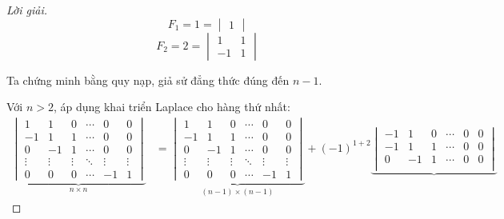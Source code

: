 \begin{proof}[Lời giải]
    \[
        F_{1} = 1 = \begin{vmatrix}1\end{vmatrix}
    \]
    \[
        F_{2} = 2 = \begin{vmatrix}1 & 1 \\ -1 & 1 \end{vmatrix}
    \]
    
    Ta chứng minh bằng quy nạp, giả sử đẳng thức đúng đến $n-1$.
    
    Với $n > 2$, áp dụng khai triển Laplace cho hàng thứ nhất:
    \begingroup{}
    \allowdisplaybreaks{}
    \begin{align*}
        \underbrace{\begin{vmatrix}
                            1      & 1      & 0      & \cdots & 0      & 0      \\
                            -1     & 1      & 1      & \cdots & 0      & 0      \\
                            0      & -1     & 1      & \cdots & 0      & 0      \\
                            \vdots & \vdots & \vdots & \ddots & \vdots & \vdots \\
                            0      & 0      & 0      & \cdots & -1     & 1
                        \end{vmatrix}}_{n\times n}
         & =
        \underbrace{\begin{vmatrix}
                            1      & 1      & 0      & \cdots & 0      & 0      \\
                            -1     & 1      & 1      & \cdots & 0      & 0      \\
                            0      & -1     & 1      & \cdots & 0      & 0      \\
                            \vdots & \vdots & \vdots & \ddots & \vdots & \vdots \\
                            0      & 0      & 0      & \cdots & -1     & 1
                        \end{vmatrix}}_{(n-1)\times (n-1)}
        +
        {(-1)}^{1+2}
        \underbrace{\begin{vmatrix}
                            -1     & 1      & 0      & \cdots & 0      & 0      \\
                            -1     & 1      & 1      & \cdots & 0      & 0      \\
                            0      & -1     & 1      & \cdots & 0      & 0      \\

\end{vmatrix}}
\end{align*}
\end{proof}
